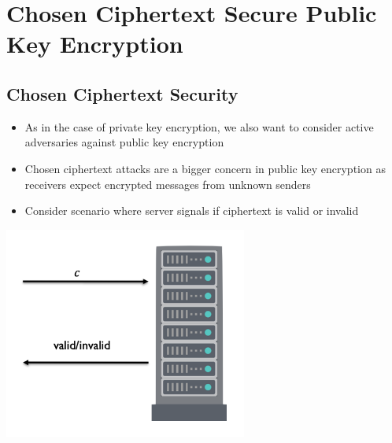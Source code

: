 

\chapter{Chosen Ciphertext Secure Public Key Encryption}

    \section{Chosen Ciphertext Security}
        \begin{itemize}
            \item As in the case of private key encryption, we also want to consider active adversaries against public key encryption
            \item Chosen ciphertext attacks are a bigger concern in public key encryption as receivers expect encrypted messages from unknown senders
            \item Consider scenario where server signals if ciphertext is valid or invalid
        \end{itemize}
        \begin{center}
	        \includegraphics[width=80mm]{Graphics/Chosen Ciphertext Secure Public Key Encryption/cca1.png}
        \end{center}

